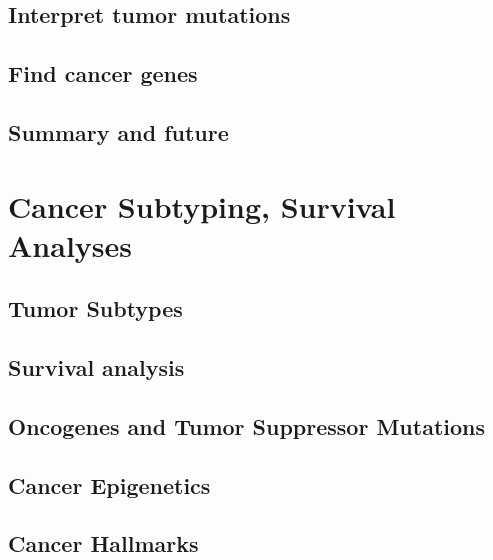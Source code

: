 \documentclass[
]{book}
\begin{document}
\hypertarget{interpret-tumor-mutations}{%
\section{Interpret tumor mutations}\label{interpret-tumor-mutations}}

\hypertarget{find-cancer-genes}{%
\section{Find cancer genes}\label{find-cancer-genes}}

\hypertarget{summary-and-future}{%
\section{Summary and future}\label{summary-and-future}}

\hypertarget{cancersub}{%
\chapter{Cancer Subtyping, Survival Analyses}\label{cancersub}}

\hypertarget{tumor-subtypes}{%
\section{Tumor Subtypes}\label{tumor-subtypes}}

\hypertarget{survival-analysis}{%
\section{Survival analysis}\label{survival-analysis}}

\hypertarget{oncogenes-and-tumor-suppressor-mutations}{%
\section{Oncogenes and Tumor Suppressor Mutations}\label{oncogenes-and-tumor-suppressor-mutations}}

\hypertarget{cancer-epigenetics}{%
\section{Cancer Epigenetics}\label{cancer-epigenetics}}

\hypertarget{cancer-hallmarks}{%
\section{Cancer Hallmarks}\label{cancer-hallmarks}}
\end{document}

